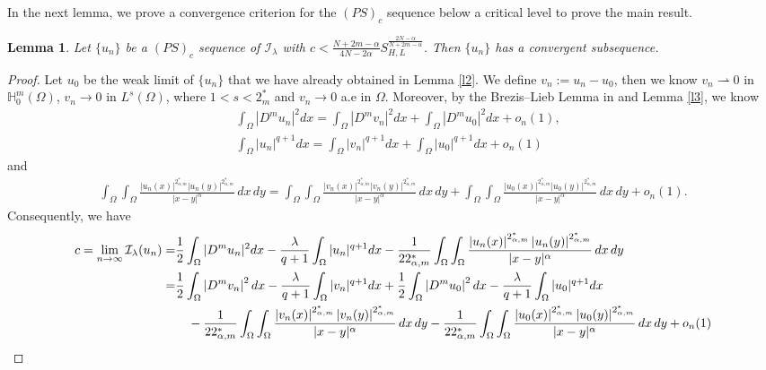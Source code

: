 \documentclass[reqno]{amsart}
\newtheorem{lemma}[theorem]{Lemma}
\newcommand{\la} {\lambda}
\newcommand{\Om}{\Omega}
\newcommand{\weak}{\rightharpoonup}
\newcommand{\al} {\alpha}
\newcommand{\mb} {\mathbb}
\newcommand{\mc} {\mathcal}
\numberwithin{theorem}{section} \numberwithin{equation}{section}
\begin{document}
\noindent In the next lemma, we prove a convergence criterion for the $(PS)_c$ sequence below a critical level to prove the main result.\\
\begin{lemma}\label{l4}
Let $\{u_n\}$ be a $(PS)_c$ sequence of $\mc{I_\la}$ with
$c<\frac{N+2m-\al}{4N-2\al} S_{H, L}^{\frac{2N-\al}{N+2m-\al}}$. Then $\{u_n\}$ has a convergent subsequence.
\end{lemma}
\begin{proof}
Let $u_0$ be the weak limit of $\{u_n\}$ that we have already obtained in Lemma \ref{l2}. We define $v_n:=u_n-u_0$, then we know $v_n \weak 0$ in $\mb{H}_0^m(\Om)$, $v_n \to 0$ in $L^s(\Om)$, where $1<s<2_m^*$ and $v_n \to 0$ a.e in $\Om$. Moreover, by the Brezis--Lieb Lemma in \cite{3brezis1983relation} and Lemma \ref{l3}, we know
\begin{align*}
&\int_{\Om}\left|D^m u_n\right|^2 d x=\int_{\Om}\left|D^mv_n\right|^2 d x+\int_{\Om}\left|D^m u_0\right|^2 d x+o_n(1), \\
&\int_{\Om}\left|u_n\right|^{q+1} d x=\int_{\Om}\left|v_n\right|^{q+1} d x+\int_{\Om}\left|u_0\right|^{q+1} d x+o_n(1)
\end{align*}
and
\begin{align*}
\int_{\Om} \int_{\Om} \frac{\left|u_n(x)\right|^{2_{\al,m}^{*}}\left|u_n(y)\right|^{2_{\al,m}^{*}}}{|x-y|^\al}\, dx \, dy=\int_{\Om} \int_{\Om} \frac{\left|v_n(x)\right|^{2_{\al, m}^{*}}\left|v_n(y)\right|^{2_{\al, m}^{*}}}{|x-y|^\al} \, dx \, dy+\int_{\Om} \int_{\Om} \frac{\left|u_0(x)\right|^{2_{\al, m}^{*}}\left|u_0(y)\right|^{2_{\al, m}^{*}}}{|x-y|^\al} \, dx \, dy+o_n(1).\end{align*}
Consequently, we have
\begin{align}\label{e36}
c = \lim _{n \to \infty}\mc{I}_\la(u_n)= & \frac{1}{2} \int_{\Om}|D^m u_n|^2 d x-\frac{\la}{q+1} \int_{\Om} |u_n|^{q+1} d x-\frac{1}{{2}{2_{\al, m}^*}} \int_{\Om} \int_{\Om} \frac{\left|u_n(x)\right|^{2_{\al, m}^*}\left|u_n(y)\right|^{2_{\al, m}^*}}{|x-y|^\al} \, dx \, dy\notag \\
= & \frac{1}{2} \int_{\Om}\left|D^mv_n\right|^2 d x-\frac{\la}{q+1} \int_{\Om} |v_n|^{q+1} d x+\frac{1}{2} \int_{\Om}\left|D^m u_0\right|^2 d x-\frac{\la}{q+1} \int_{\Om} |u_0|^{q+1} d x \notag\\
&  \quad -\frac{1}{{2}{2_{\al, m}^*}} \int_{\Om} \int_{\Om} \frac{\left|v_n(x)\right|^{2_{\al, m}^*}\left|v_n(y)\right|^{2_{\al, m}^*}}{|x-y|^\al} \, dx \, dy-\frac{1}{22_{\al, m}^*} \int_{\Om} \int_{\Om} \frac{\left|u_0(x)\right|^{2_{\al, m}^*}\left|u_0(y)\right|^{2_{\al, m}^*}}{|x-y|^\al} \, dx \, dy +o_n(1)\notag \\

\end{align}
\end{proof}
\end{document}

